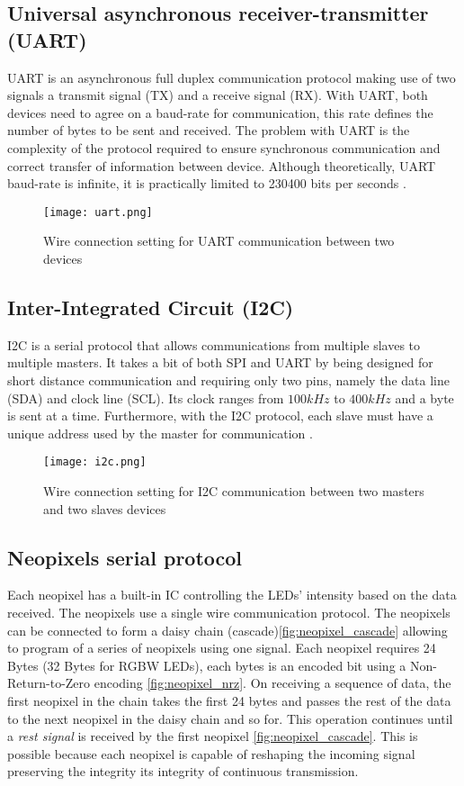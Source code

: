 \subsection{Universal asynchronous receiver-transmitter (UART)}
UART is an asynchronous full duplex communication protocol making use of two signals a transmit signal (TX) and a receive signal (RX). With UART, both devices need to agree on a baud-rate for communication, this rate defines the number of bytes to be sent and received. The problem with UART is the complexity of the protocol required to ensure synchronous communication and correct transfer of information between device. Although theoretically, UART baud-rate is infinite, it is practically limited to 230400 bits per seconds \cite{uart}.   
\begin{figure}[h!]
\centering
\texttt{[image: uart.png]}
\caption{Wire connection setting for UART communication between two devices}
\label{fig:uart_coms}
\end{figure}
\subsection{Inter-Integrated Circuit (I2C)}
I2C is a serial protocol that allows communications from multiple slaves to multiple masters. It takes a bit of both SPI and UART by being designed for short distance communication and requiring only two pins, namely the data line (SDA) and clock line (SCL). Its clock ranges from $100kHz$ to $400kHz$ and a byte is sent at a time. Furthermore, with the I2C protocol, each slave must have a unique address used by the master for communication \cite{i2c}.  
\begin{figure}[h!]
\centering
\texttt{[image: i2c.png]}
\caption{Wire connection setting for I2C communication between two masters and two slaves devices}
\label{fig:i2c_coms}
\end{figure}
\subsection{Neopixels serial protocol}
Each neopixel has a built-in IC controlling the LEDs' intensity based on the data received. The neopixels use a single wire communication protocol. The neopixels can be connected to form a daisy chain (cascade)\cref{fig:neopixel_cascade} allowing to program of a series of neopixels using one signal. Each neopixel requires 24 Bytes (32 Bytes for RGBW LEDs), each bytes is an encoded bit using a Non-Return-to-Zero encoding \cref{fig:neopixel_nrz}. On receiving a sequence of data, the first neopixel in the chain takes the first 24 bytes and passes the rest of the data to the next neopixel in the daisy chain and so for. This operation continues until a \textit{rest signal} is received by the first neopixel \cref{fig:neopixel_cascade}. This is possible because each neopixel is capable of reshaping the incoming signal preserving the integrity its integrity of continuous transmission.

